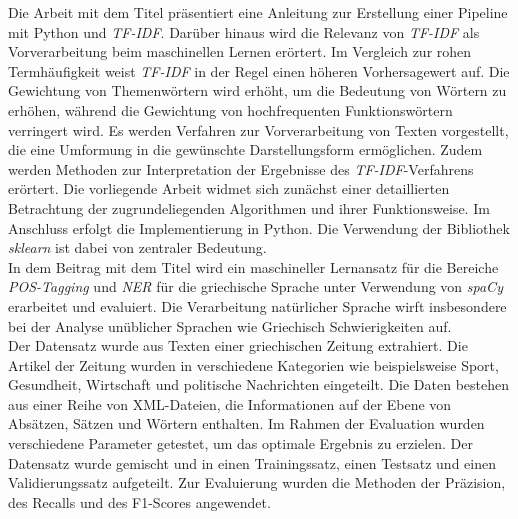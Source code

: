 Die Arbeit mit dem Titel \cite{lavin2019analyzing} präsentiert eine Anleitung zur Erstellung einer Pipeline mit Python und \emph{TF-IDF}. Darüber hinaus wird die Relevanz von \emph{TF-IDF} als Vorverarbeitung beim maschinellen Lernen erörtert. Im Vergleich zur rohen Termhäufigkeit weist \emph{TF-IDF} in der Regel einen höheren Vorhersagewert auf. Die Gewichtung von Themenwörtern wird erhöht, um die Bedeutung von Wörtern zu erhöhen, während die Gewichtung von hochfrequenten Funktionswörtern verringert wird. Es werden Verfahren zur Vorverarbeitung von Texten vorgestellt, die eine Umformung in die gewünschte Darstellungsform ermöglichen. Zudem werden Methoden zur Interpretation der Ergebnisse des \emph{TF-IDF}-Verfahrens erörtert. Die vorliegende Arbeit widmet sich zunächst einer detaillierten Betrachtung der zugrundeliegenden Algorithmen und ihrer Funktionsweise. Im Anschluss erfolgt die Implementierung in Python. Die Verwendung der Bibliothek \emph{sklearn} ist dabei von zentraler Bedeutung.\\

In dem Beitrag mit dem Titel \cite{partalidou2019design} wird ein maschineller Lernansatz für die Bereiche \emph{POS-Tagging} und \emph{NER} für die griechische Sprache unter Verwendung von \emph{spaCy} erarbeitet und evaluiert. Die Verarbeitung natürlicher Sprache wirft insbesondere bei der Analyse unüblicher Sprachen wie Griechisch Schwierigkeiten auf.\\ Der Datensatz wurde aus Texten einer griechischen Zeitung extrahiert. Die Artikel der Zeitung wurden in verschiedene Kategorien wie beispielsweise Sport, Gesundheit, Wirtschaft und politische Nachrichten eingeteilt. Die Daten bestehen aus einer Reihe von XML-Dateien, die Informationen auf der Ebene von Absätzen, Sätzen und Wörtern enthalten. Im Rahmen der Evaluation wurden verschiedene Parameter getestet, um das optimale Ergebnis zu erzielen. Der Datensatz wurde gemischt und in einen Trainingssatz, einen Testsatz und einen Validierungssatz aufgeteilt. Zur Evaluierung wurden die Methoden der Präzision, des Recalls und des F1-Scores angewendet.

